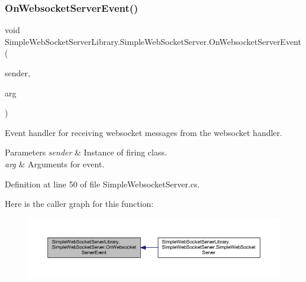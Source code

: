 \subsubsection{\texorpdfstring{On\+Websocket\+Server\+Event()}{OnWebsocketServerEvent()}}
{\footnotesize\ttfamily void Simple\+Web\+Socket\+Server\+Library.\+Simple\+Web\+Socket\+Server.\+On\+Websocket\+Server\+Event (\begin{DoxyParamCaption}\item[{object}]{sender,  }\item[{\mbox{\hyperlink{class_simple_web_socket_server_library_1_1_web_socket_event_arg}{Web\+Socket\+Event\+Arg}}}]{arg }\end{DoxyParamCaption})\hspace{0.3cm}{\ttfamily [private]}}



Event handler for receiving websocket messages from the websocket handler. 


\begin{DoxyParams}{Parameters}
{\em sender} & Instance of firing class.\\
\hline
{\em arg} & Arguments for event.\\
\hline
\end{DoxyParams}


Definition at line 50 of file Simple\+Websocket\+Server.\+cs.

Here is the caller graph for this function\+:
\nopagebreak
\begin{figure}[H]
\begin{center}
\leavevmode
\includegraphics[width=350pt]{class_simple_web_socket_server_library_1_1_simple_web_socket_server_acc5670ca5bb72d689d08682f5328477e_icgraph}
\end{center}
\end{figure}
\mbox{\label{class_simple_web_socket_server_library_1_1_simple_web_socket_server_ac6ddccc7dd4b54d16721d2dca025dc58}} 
